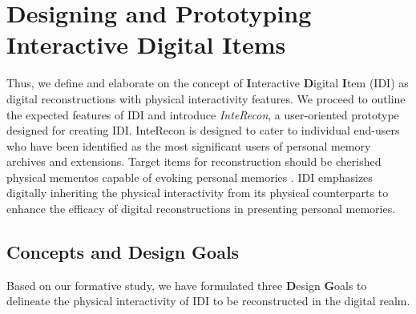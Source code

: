 \section{Designing and Prototyping Interactive Digital Items}

Thus, we define and elaborate on the concept of \textbf{I}nteractive \textbf{D}igital \textbf{I}tem (IDI) as digital reconstructions with physical interactivity features. 
We proceed to outline the expected features of IDI and introduce \emph{InteRecon}, a user-oriented prototype designed for creating IDI.
InteRecon is designed to cater to individual end-users who have been identified as the most significant users of personal memory archives and extensions. 
Target items for reconstruction should be cherished physical mementos capable of evoking personal memories \cite{kirk2010human,10.1145/3173574.3173998,10.1145/3544549.3585588}. 
IDI emphasizes digitally inheriting the physical interactivity from its physical counterparts to enhance the efficacy of digital reconstructions in presenting personal memories.


\subsection{Concepts and Design Goals}
Based on our formative study, we have formulated three \textbf{D}esign \textbf{G}oals to delineate the physical interactivity of IDI to be reconstructed in the digital realm.

